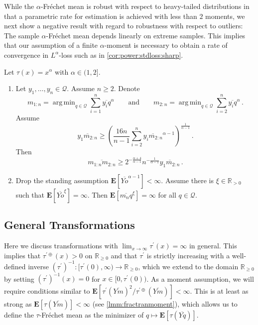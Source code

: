 \documentclass{article}
\newcommand*{\mc}[1]{\mathcal{#1}}
\newcommand{\R}{\mathbb{R}}
\newcommand{\Rp}{\R_{\geq0}}
\newcommand{\Rpp}{\R_{>0}}
\newcommand{\lb}{\left(} %
\newcommand{\rb}{\right)} %
\newcommand{\br}[1]{\lb #1 \rb} %
\newcommand{\E}{\mathbf{E}} %
\newcommand{\Eof}[1]{\E[#1]}
\newcommand{\pr}{^\prime}
\newcommand{\eqfs}{\,.}
\DeclareMathOperator*{\argmin}{arg\,min}
\newcommand{\ol}[2]{\overline{#1#2}}
\newcommand{\tran}{\tau}
\newcommand{\dtran}{\tau\pr}
\newcommand{\ddrtran}{\tau^{\prime\oplus}}
\newcommand{\invdtran}{(\tau\pr)^{-1}}
\begin{document}
While the $\alpha$-Fr\'echet mean is robust with respect to heavy-tailed distributions in that a parametric rate for estimation is achieved with less than $2$ moments, we next show a negative result with regard to robustness with respect to outliers: The sample $\alpha$-Fr\'echet mean depends linearly on extreme samples. This implies that our assumption of a finite $\alpha$-moment is necessary to obtain a rate of convergence in $L^\alpha$-loss such as in \cref{cor:power:stdloss:sharp}.
%
\begin{theorem}\label{thm:power:lower:lin}
    Let $\tran(x) = x^\alpha$ with $\alpha \in (1,2]$.
    \begin{enumerate}[label=(\roman*)]
        \item 
        Let $y_1, \dots, y_n \in \mc Q$. 
        Assume $n\geq 2$.
        Denote 
        \begin{equation}
            m_{1:n} = \argmin_{q\in\mc Q} \sum_{i=1}^n \ol{y_i}{q}^\alpha
            \qquad\text{and}\qquad
            m_{2:n} = \argmin_{q\in\mc Q} \sum_{i=2}^n \ol{y_i}{q}^\alpha
            \eqfs
        \end{equation}
        Assume 
        \begin{equation}
            \ol {y_1}{m_{2:n}} \geq \br{\frac{16 n}{n-1}\sum_{i=2}^n \ol{y_i}{m_{2:n}}^{\alpha-1}}^{\frac{1}{\alpha-1}}
            \eqfs
        \end{equation}
        Then
        \begin{equation}
            \ol{m_{1:n}}{m_{2:n}} \geq 2^{-\frac{\alpha+4}{\alpha-1}} n^{-\frac{1}{\alpha-1}} \ol{y_1}{m_{2:n}}
            \eqfs
        \end{equation}
        \item 
        Drop the standing assumption $\Eof{\ol Yo^{\alpha-1}} < \infty$.
        Assume there is $\xi\in\Rpp$ such that $\Eof{\ol {Y}o^\xi} = \infty$. Then $\Eof{\ol {m_n}q^\xi} = \infty$ for all $q\in \mc Q$. 
    \end{enumerate}
\end{theorem}
%
%
%
\subsection{General Transformations}\label{sec:tailrobust}
%
Here we discuss transformations with $\lim_{x\to\infty}\dtran(x) = \infty$ in general. This implies that $\ddrtran(x)>0$ on $\Rp$ and that $\dtran$ is strictly increasing with a well-defined inverse $\invdtran\colon[\dtran(0), \infty) \to \Rp$, which we extend to the domain $\Rp$ by setting $\invdtran(x)=0$ for $x\in [0, \dtran(0))$.
As a moment assumption, we will require conditions similar to $\Eof{\dtran(\ol Ym)^2 / \ddrtran(\ol Ym)} < \infty$. This is at least as strong as $\Eof{\tran(\ol Ym)} < \infty$ (see \cref{lmm:fractranmoment}), which allows us to define the $\tran$-Fr\'echet mean as the minimizer of $q\mapsto \Eof{\tran(\ol Yq)}$.
\end{document}
